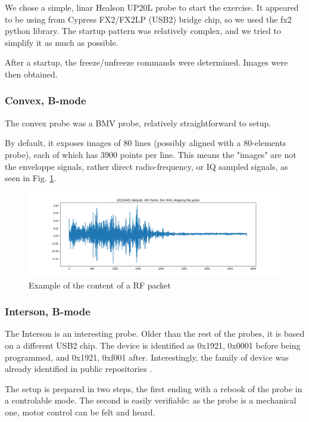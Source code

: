 \documentclass{article}
\begin{document}
We chose a simple, linar Healson UP20L probe to start the exercise. It appeared to be using from Cypress FX2/FX2LP (USB2) bridge chip, so we used the fx2 python library. The startup pattern was relatively complex, and we tried to simplify it as much as possible.

After a startup, the freeze/unfreeze commands were determined. Images were then obtained.


\subsubsection{Convex, B-mode}

The convex probe was a BMV probe, relatively straightforward to setup.

By default, it exposes images of 80 lines (possibly aligned with a 80-elements probe), each of which has 3900 points per line. This means the "images" are not the enveloppe signals, rather direct radio-frequency, or IQ sampled signals, as seen in Fig. \ref{fig:RF}. 

\begin{figure}[htp!]
  \centering
    \includegraphics[width=0.98\linewidth]{images/20210401_detail.png}
    \caption{Example of the content of a RF packet}
    \label{fig:RF}
  \end{figure}



\subsubsection{Interson, B-mode}

The Interson is an interesting probe. Older than the rest of the probes, it is based on a different USB2 chip. The device is identified as 0x1921, 0x0001 before being programmed, and 0x1921, 0xf001 after. Interestingly, the family of device was already identified in public repositories \cite{kitware}.

The setup is prepared in two steps, the first ending with a rebook of the probe in a controlable mode. The second is easily verifiable: as the probe is a mechanical one, motor control can be felt and heard.
\end{document}
